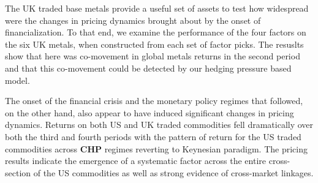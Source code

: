 \documentclass[12pt,]{article}
\begin{document}
The UK traded base metals provide a useful set of assets to test how
widespread were the changes in pricing dynamics brought about by the
onset of financialization. To that end, we examine the performance of
the four factors on the six UK metals, when constructed from each set of
factor picks. The resuslts show that here was co-movement in global
metals returns in the second period and that this co-movement could be
detected by our hedging pressure based model.

The onset of the financial crisis and the monetary policy regimes that
followed, on the other hand, also appear to have induced significant
changes in pricing dynamics. Returns on both US and UK traded
commodities fell dramatically over both the third and fourth periods
with the pattern of return for the US traded commodities across
\textbf{CHP} regimes reverting to Keynesian paradigm. The pricing
results indicate the emergence of a systematic factor across the entire
cross-section of the US commodities as well as strong evidence of
cross-market linkages.
\end{document}
